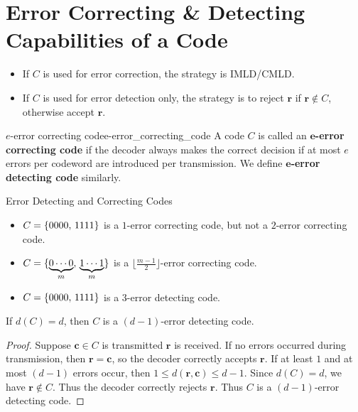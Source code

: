 
\section{Error Correcting \& Detecting Capabilities of a Code}
\begin{itemize}
    \item If $ C $ is used for error correction, the strategy is IMLD/CMLD\@.
    \item If $ C $ is used for error detection only, the strategy is
          to reject $ \bm{r} $ if $ \bm{r}\notin C $, otherwise accept $ \bm{r} $.
\end{itemize}

\begin{Definition}{$ e $-error correcting code}{e-error_correcting_code}
    A code $ C $ is called an \textbf{$\bm{e}$-error correcting code}
    if the decoder always makes the correct decision if
    at most $ e $ errors per codeword are introduced per transmission.
    We define \textbf{$\bm{e}$-error detecting code} similarly.
\end{Definition}

\begin{Example}{Error Detecting and Correcting Codes}{}
    \begin{itemize}
        \item $ C=\{0000,\,1111\} $ is a $ 1 $-error correcting code, but not a
              $ 2 $-error correcting code.
        \item $ C=\{\underbrace{0\cdots 0}_{m},\,\underbrace{1\cdots 1}_{m}\} $
              is a $ \bigl\lfloor \frac{m-1}{2} \bigr\rfloor $-error correcting code.
        \item $ C=\{0000,\,1111\} $ is a $ 3 $-error detecting code.
    \end{itemize}
\end{Example}

\begin{Theorem}{}{}
    If $ d(C)=d $, then $ C $ is a $ (d-1) $-error detecting code.
\end{Theorem}

\begin{proof}
    Suppose $ \bm{c}\in C $ is transmitted $ \bm{r} $ is received. If no
    errors occurred during transmission, then $ \bm{r}=\bm{c} $,
    so the decoder correctly accepts $ \bm{r} $. If at least $ 1 $
    and at most $ (d-1) $ errors occur, then
    $ 1\leqslant d(\bm{r},\bm{c})\leqslant d-1 $. Since $ d(C)=d $,
    we have $ \bm{r}\notin C $. Thus the decoder correctly rejects
    $ \bm{r} $. Thus $ C $ is a $ (d-1) $-error detecting code.
\end{proof}

